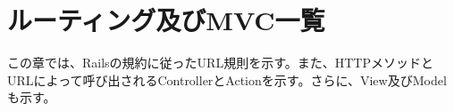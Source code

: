 \documentclass[a4j]{jarticle}
\begin{document}
\begin{figure}[H]
\begin{center}
\end{center}
\end{figure}


\section{ルーティング及びMVC一覧}
この章では、Railsの規約に従ったURL規則を示す。また、HTTPメソッドとURLによって呼び出されるControllerとActionを示す。さらに、View及びModelも示す。
\newpage
\end{document}
